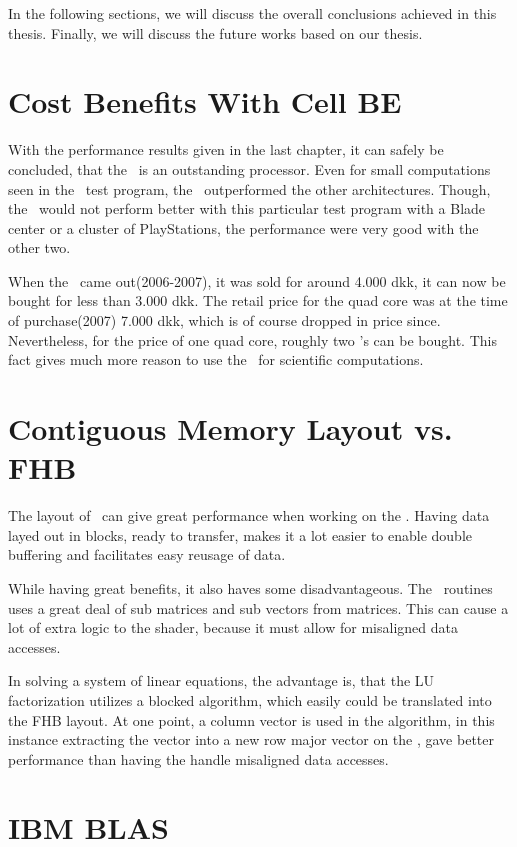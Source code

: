 In the following sections, we will discuss the overall conclusions
achieved in this thesis. Finally, we will discuss the future works
based on our thesis.

\section{Cost Benefits With Cell BE}

With the performance results given in the last chapter, it can safely
be concluded, that the \CBE\ is an outstanding processor. Even for
small computations seen in the \SOR\ test program, the \CBE\
outperformed the other architectures. Though, the \CBE\ would not
perform better with this particular test program with a Blade center
or a cluster of PlayStations, the performance were very good with the
other two.

When the \PS\ came out(2006-2007), it was sold for around 4.000 dkk,
it can now be bought for less than 3.000 dkk. The retail price for the
quad core was at the time of purchase(2007) 7.000 dkk, which is of
course dropped in price since. Nevertheless, for the price of one quad
core, roughly two \PS{}'s can be bought. This fact gives much more
reason to use the \CBE\ for scientific computations.

\section{Contiguous Memory Layout vs. FHB}

The layout of \FHB\ can give great performance when working on the
\CBE{}. Having data layed out in blocks, ready to transfer, makes it a
lot easier to enable double buffering and facilitates easy reusage of
data.

While having great benefits, it also haves some disadvantageous. The
\LAPACK\ routines uses a great deal of sub matrices and sub vectors
from matrices. This can cause a lot of extra logic to the shader,
because it must allow for misaligned data accesses.

In solving a system of linear equations, the advantage is, that the LU
factorization utilizes a blocked algorithm, which easily could be
translated into the FHB layout. At one point, a column vector is used
in the algorithm, in this instance extracting the vector into a new
row major vector on the \PPE{}, gave better performance than having
the \SPEv{'s} handle misaligned data accesses.

\section{IBM BLAS}
\label{sec:IBMBLAS}

